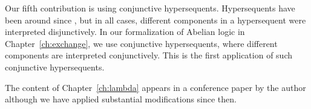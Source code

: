 Our fifth contribution is using conjunctive hypersequents.
Hypersequents have been around since \citet{avron91}, but
in all cases, different components in a hypersequent were interpreted
disjunctively.
In our formalization of Abelian logic in Chapter~\ref{ch:exchange},
we use conjunctive hypersequents, where different components are
interpreted conjunctively.
This is the first application of such conjunctive hypersequents.


The content of Chapter~\ref{ch:lambda} appears in
a conference paper by the author \citep{hiraiflops2012}
although we have applied substantial modifications since then.



